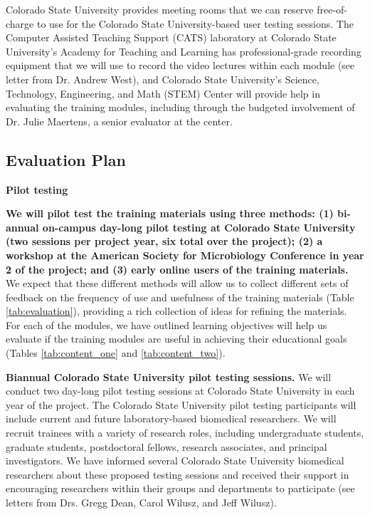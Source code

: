 \documentclass[pdftex,english,11.5pt,parskip=half]{scrartcl}
\begin{document}
Colorado State University provides meeting rooms
that we can reserve free-of-charge to use for the Colorado State University-based user testing sessions. The
Computer Assisted Teaching Support (CATS) laboratory at Colorado State University's Academy for
Teaching and Learning has professional-grade recording equipment that we will
use to record the video lectures within each module (see letter from Dr. Andrew
West), and Colorado State University's Science, Technology, Engineering, and Math (STEM) Center will provide help in evaluating the training modules,
including through the budgeted involvement of Dr. Julie Maertens, a senior
evaluator at the center. 

\subsection{Evaluation Plan}

\textbf{Pilot testing}

\textbf{We will pilot test the training materials using three methods: (1) bi-annual on-campus  day-long pilot testing at Colorado State University (two sessions per project year, six total over the project); (2) a workshop at the American Society for Microbiology Conference in year 2 of the project; and (3) early online users of the training materials.} We expect that these different methods will allow us to collect different sets of 
feedback on the frequency of use and usefulness of the training materials (Table \ref*{tab:evaluation}), providing a rich collection of ideas for refining the materials. For each of the modules, we have outlined learning objectives will help us evaluate if the training modules are useful in achieving their educational goals (Tables \ref*{tab:content_one} and \ref*{tab:content_two}).



\textbf{Biannual Colorado State University pilot testing sessions.}
We will conduct two day-long pilot testing sessions at Colorado State University in each year of the
project. The Colorado State University pilot testing participants will include current and future
laboratory-based biomedical researchers. We will recruit trainees with a variety
of research roles, including undergraduate students, graduate students,
postdoctoral fellows, research associates, and principal investigators. We have
informed several Colorado State University biomedical researchers about these proposed testing
sessions and received their support in encouraging researchers within their
groups and departments to participate (see letters from Drs. Gregg Dean, Carol Wilusz, and Jeff Wilusz). 
\end{document}
